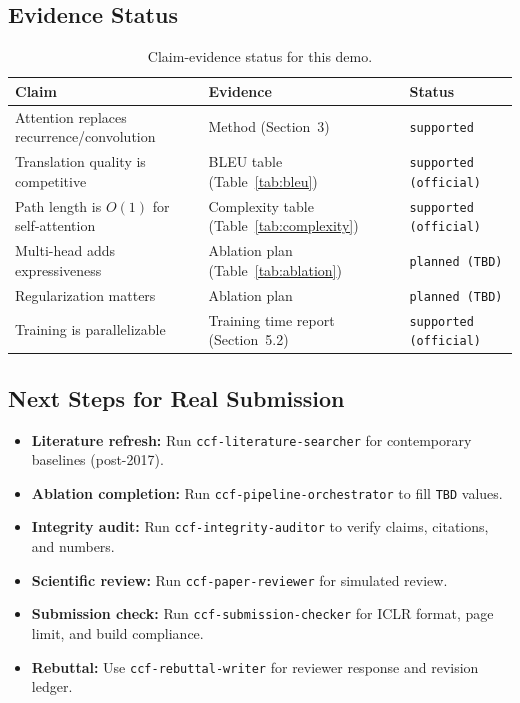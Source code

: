 ﻿\documentclass{article}
\begin{document}
\subsection{Evidence Status}

\begin{table}[h]
 \centering
 \caption{Claim-evidence status for this demo.}
 \small
 \begin{tabular}{P{3.8cm} P{3.5cm} P{3.2cm}}
 \toprule
 Claim & Evidence & Status \\
 \midrule
 Attention replaces recurrence\slash{}convolution & Method (Section~3) & \texttt{supported} \\
 Translation quality is competitive & BLEU table (Table~\ref{tab:bleu}) & \texttt{supported (official)} \\
 Path length is $O(1)$ for self-attention & Complexity table (Table~\ref{tab:complexity}) & \texttt{supported (official)} \\
 Multi-head adds expressiveness & Ablation plan (Table~\ref{tab:ablation}) & \texttt{planned (TBD)} \\
 Regularization matters & Ablation plan & \texttt{planned (TBD)} \\
 Training is parallelizable & Training time report (Section~5.2) & \texttt{supported (official)} \\
 \bottomrule
 \end{tabular}
\end{table}

\subsection{Next Steps for Real Submission}

\begin{itemize}
 \item \textbf{Literature refresh:} Run \texttt{ccf-literature-searcher} for contemporary baselines (post-2017).
 \item \textbf{Ablation completion:} Run \texttt{ccf-pipeline-orchestrator} to fill \texttt{TBD} values.
 \item \textbf{Integrity audit:} Run \texttt{ccf-integrity-auditor} to verify claims, citations, and numbers.
 \item \textbf{Scientific review:} Run \texttt{ccf-paper-reviewer} for simulated review.
 \item \textbf{Submission check:} Run \texttt{ccf-submission-checker} for ICLR format, page limit, and build compliance.
 \item \textbf{Rebuttal:} Use \texttt{ccf-rebuttal-writer} for reviewer response and revision ledger.
\end{itemize}
\end{document}
